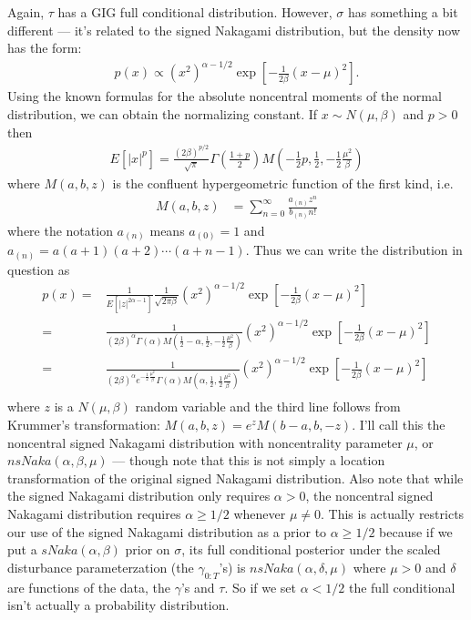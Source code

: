 \documentclass{article}\usepackage[]{graphicx}\usepackage[]{color}
\begin{document}
Again, $\tau$ has a GIG full conditional distribution. However, $\sigma$ has something a bit different --- it's related to the signed Nakagami distribution, but the density now has the form:
\begin{align*}
  p(x)\propto (x^2)^{\alpha - 1/2}\exp\left[-\frac{1}{2\beta}(x-\mu)^2\right].
\end{align*}
Using the known formulas for the absolute noncentral moments of the normal distribution, we can obtain the normalizing constant. If $x\sim N(\mu,\beta)$ and $p>0$ then 
\begin{align*}
  E[|x|^{p} ] = \frac{(2\beta)^{p/2}}{\sqrt{\pi}}\Gamma\left(\frac{1+p}{2}\right)M\left(-\frac{1}{2}p,\frac{1}{2},-\frac{1}{2}\frac{\mu^2}{\beta}\right)
\end{align*}
where $M(a,b,z)$ is the confluent hypergeometric function of the first kind, i.e.
\begin{align*}
  M(a,b,z) & = \sum_{n=0}^\infty \frac{a_{(n)}z^n}{b_{(n)}n!}
\end{align*}
where the notation $a_{(n)}$ means  $a_{(0)}=1$ and $a_{(n)} = a(a+1)(a+2)\cdots(a+n-1)$. Thus we can write the distribution in question as 
\begin{align*}
  p(x) =& \frac{1}{E[|z|^{2\alpha -1}]}\frac{1}{\sqrt{2\pi \beta}} (x^2)^{\alpha - 1/2}\exp\left[-\frac{1}{2\beta}(x-\mu)^2\right]\\
  =& \frac{1}{(2\beta)^{\alpha}\Gamma\left(\alpha\right)M\left(\frac{1}{2}-\alpha,\frac{1}{2},-\frac{1}{2}\frac{\mu^2}{\beta}\right)}(x^2)^{\alpha - 1/2}\exp\left[-\frac{1}{2\beta}(x-\mu)^2\right]\\
    =& \frac{1}{(2\beta)^{\alpha}e^{-\frac{1}{2}\frac{\mu^2}{\beta}}\Gamma\left(\alpha\right)M\left(\alpha,\frac{1}{2},\frac{1}{2}\frac{\mu^2}{\beta}\right)}(x^2)^{\alpha - 1/2}\exp\left[-\frac{1}{2\beta}(x-\mu)^2\right]\\
\end{align*}
where $z$ is a $N(\mu,\beta)$ random variable and the third line follows from Krummer's transformation: $M(a,b,z)=e^zM(b-a,b,-z)$. I'll call this the noncentral signed Nakagami distribution with noncentrality parameter $\mu$, or $nsNaka(\alpha, \beta, \mu)$ --- though note that this is not simply a location transformation of the original signed Nakagami distribution. Also note that while the signed Nakagami distribution only requires $\alpha>0$, the noncentral signed Nakagami distribution requires $\alpha\geq 1/2$ whenever $\mu\neq 0$. This is actually restricts our use of the signed Nakagami distribution as a prior to $\alpha\geq 1/2$ because if we put a $sNaka(\alpha,\beta)$ prior on $\sigma$, its full conditional posterior under the scaled disturbance parameterzation (the $\gamma_{0:T}$'s) is $nsNaka(\alpha,\delta,\mu)$ where $\mu>0$ and $\delta$ are functions of the data, the $\gamma$'s and $\tau$. So if we set $\alpha <1/2$ the full conditional isn't actually a probability distribution.
\end{document}
